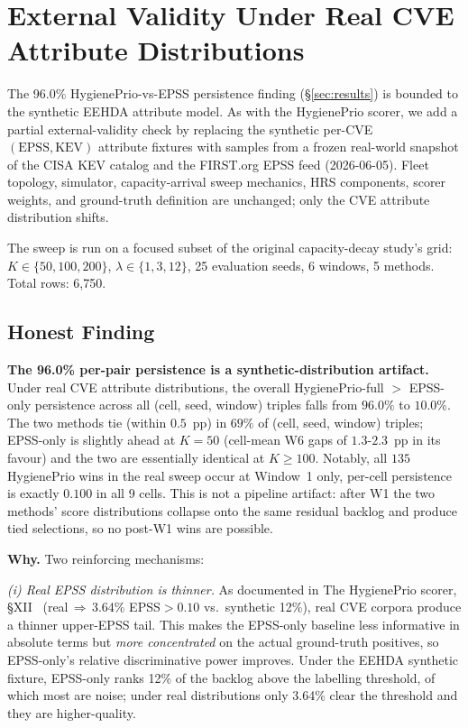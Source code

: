 \section{External Validity Under Real CVE Attribute Distributions}
\label{sec:external_validity}

The 96.0\% HygienePrio-vs-EPSS persistence finding (\S\ref{sec:results})
is bounded to the synthetic EEHDA attribute model. As with the HygienePrio scorer,
we add a partial external-validity check by replacing the
synthetic per-CVE $(\mathrm{EPSS}, \mathrm{KEV})$ attribute fixtures
with samples from a frozen real-world snapshot of the CISA KEV catalog
and the FIRST.org EPSS feed (2026-06-05). Fleet topology, simulator,
capacity-arrival sweep mechanics, HRS components, scorer weights, and
ground-truth definition are unchanged; only the CVE attribute
distribution shifts.

The sweep is run on a focused subset of the original capacity-decay study's grid:
$K \in \{50, 100, 200\}$, $\lambda \in \{1, 3, 12\}$, 25 evaluation
seeds, 6 windows, 5 methods. Total rows: 6{,}750.



\subsection{Honest Finding}

\textbf{The 96.0\% per-pair persistence is a synthetic-distribution
artifact.} Under real CVE attribute distributions, the overall
HygienePrio-full $>$ EPSS-only persistence across all
(cell, seed, window) triples falls from $96.0\%$ to $\mathbf{10.0\%}$.
The two methods tie (within $0.5$~pp) in $69\%$ of (cell, seed, window)
triples; EPSS-only is slightly ahead at $K = 50$ (cell-mean W6 gaps of
$1.3$-$2.3$~pp in its favour) and the two are essentially identical
at $K \geq 100$. Notably, all $135$ HygienePrio wins in the real sweep
occur at Window~1 only, per-cell persistence is exactly $0.100$ in
all 9 cells. This is not a pipeline artifact: after W1 the two methods'
score distributions collapse onto the same residual backlog and produce
tied selections, so no post-W1 wins are possible.

\textbf{Why.} Two reinforcing mechanisms:

\textit{(i) Real EPSS distribution is thinner.} As documented in
The HygienePrio scorer, \S XII~\cite{paper4hygieneprio} (real$\,\Rightarrow\,$3.64\%
EPSS$>0.10$ vs.\ synthetic 12\%), real CVE corpora produce a thinner
upper-EPSS tail. This makes the EPSS-only baseline less informative
in absolute terms but \emph{more concentrated} on the actual
ground-truth positives, so EPSS-only's relative discriminative power
improves. Under the EEHDA synthetic fixture, EPSS-only ranks 12\% of
the backlog above the labelling threshold, of which most are noise;
under real distributions only 3.64\% clear the threshold and they
are higher-quality.


